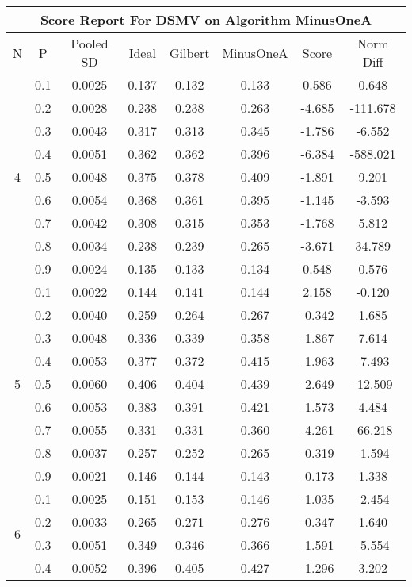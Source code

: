 \documentclass[11pt,a4paper]{report}
\begin{document}
\begin{longtable}{ | c | c || c | c | c | c | c | c | }
\hline
\multicolumn{8}{|c|}{ Score Report For DSMV on Algorithm MinusOneA} \\
\hline
N & P & Pooled SD &  Ideal &  Gilbert & MinusOneA  & Score & Norm Diff \\
 \hline
 \hline
 \endhead
\multirow{9}{*}{4} & 0.1 & 0.0025 & 0.137 & 0.132 & 0.133 & 0.586 & 0.648 \\
 & 0.2 & 0.0028 & 0.238 & 0.238 & 0.263 & -4.685 & -111.678 \\
 & 0.3 & 0.0043 & 0.317 & 0.313 & 0.345 & -1.786 & -6.552 \\
 & 0.4 & 0.0051 & 0.362 & 0.362 & 0.396 & -6.384 & -588.021 \\
 & 0.5 & 0.0048 & 0.375 & 0.378 & 0.409 & -1.891 & 9.201 \\
 & 0.6 & 0.0054 & 0.368 & 0.361 & 0.395 & -1.145 & -3.593 \\
 & 0.7 & 0.0042 & 0.308 & 0.315 & 0.353 & -1.768 & 5.812 \\
 & 0.8 & 0.0034 & 0.238 & 0.239 & 0.265 & -3.671 & 34.789 \\
 & 0.9 & 0.0024 & 0.135 & 0.133 & 0.134 & 0.548 & 0.576 \\
 \hline
\multirow{9}{*}{5} & 0.1 & 0.0022 & 0.144 & 0.141 & 0.144 & 2.158 & -0.120 \\
 & 0.2 & 0.0040 & 0.259 & 0.264 & 0.267 & -0.342 & 1.685 \\
 & 0.3 & 0.0048 & 0.336 & 0.339 & 0.358 & -1.867 & 7.614 \\
 & 0.4 & 0.0053 & 0.377 & 0.372 & 0.415 & -1.963 & -7.493 \\
 & 0.5 & 0.0060 & 0.406 & 0.404 & 0.439 & -2.649 & -12.509 \\
 & 0.6 & 0.0053 & 0.383 & 0.391 & 0.421 & -1.573 & 4.484 \\
 & 0.7 & 0.0055 & 0.331 & 0.331 & 0.360 & -4.261 & -66.218 \\
 & 0.8 & 0.0037 & 0.257 & 0.252 & 0.265 & -0.319 & -1.594 \\
 & 0.9 & 0.0021 & 0.146 & 0.144 & 0.143 & -0.173 & 1.338 \\
 \hline
\multirow{9}{*}{6} & 0.1 & 0.0025 & 0.151 & 0.153 & 0.146 & -1.035 & -2.454 \\
 & 0.2 & 0.0033 & 0.265 & 0.271 & 0.276 & -0.347 & 1.640 \\
 & 0.3 & 0.0051 & 0.349 & 0.346 & 0.366 & -1.591 & -5.554 \\
 & 0.4 & 0.0052 & 0.396 & 0.405 & 0.427 & -1.296 & 3.202 \\

\end{longtable}
\end{document}
